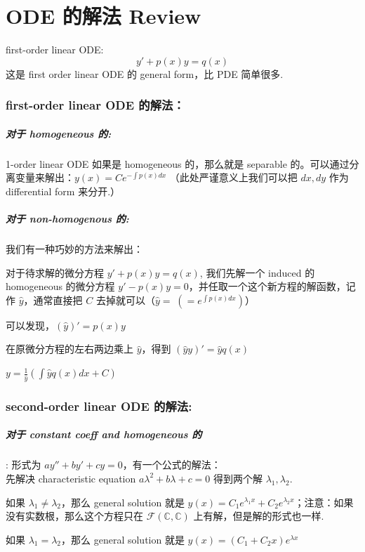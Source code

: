 \chapter{ODE 的解法 Review}
\begin{defn}
    first-order linear ODE:\\
    $$
    y' + p(x)y = q(x)
    $$
    这是 first order linear ODE 的 general form，比 PDE 简单很多.
\end{defn}

\subsection{first-order linear ODE 的解法：}
\paragraph{对于 homogeneous 的: }
1-order linear ODE 如果是 homogeneous 的，那么就是 separable 的。可以通过分离变量来解出：$y(x) = Ce^{-\int p(x)dx}$ （此处严谨意义上我们可以把 $dx, dy$ 作为 differential form 来分开.）

\paragraph{对于 non-homogenous 的:}
我们有一种巧妙的方法来解出：
\begin{compactenumI}
    \item 对于待求解的微分方程 $y' + p(x)y = q(x)$, 我们先解一个 induced 的 homogeneous  的微分方程 $y' - p(x)y = 0$，并任取一个这个新方程的解函数，记作 $\hat{y}$，通常直接把 $C$ 去掉就可以（$\hat{y} = \; (= e^{\int p(x) dx})$）
    \item 可以发现，$(\hat{y})' = p(x)y$
    \item 在原微分方程的左右两边乘上 $\hat{y}$，得到 $(\hat{y}y)' = \hat{y}q(x)$
    \item $y = \frac{1}{\hat{y}} (\int \hat{y}q(x)dx + C)$
\end{compactenumI}

\subsection{second-order linear ODE 的解法:}
\paragraph{对于 constant coeff and homogeneous 的}: 形式为 $ay'' + by' + cy = 0$，有一个公式的解法：
\\先解决 characteristic equation $a\lambda^2 + b\lambda + c = 0$ 得到两个解 $\lambda_1, \lambda_2$.
\begin{compactenumI}
    \item 如果 $\lambda_1 \not= \lambda_2$，那么 general solution 就是 $y(x) = C_1 e^{\lambda_1 x} + C_2 e^{\lambda_2 x}$；注意：如果没有实数根，那么这个方程只在 $\mathcal{F}(\mathbb{C}, \mathbb{C})$ 上有解，但是解的形式也一样.
    \item 如果 $\lambda_1 = \lambda_2$，那么 general solution 就是 $y(x) = (C_1 + C_2 x) e^{\lambda x}$
\end{compactenumI}

